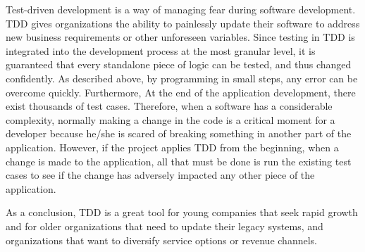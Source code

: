 Test-driven development is a way of managing fear during software development\cite{Beck2003}. TDD gives organizations the ability to painlessly update their software to address new business requirements or other unforeseen variables. Since testing in TDD is integrated into the development process at the most granular level, it is guaranteed that every standalone piece of logic can be tested, and thus changed confidently. As described above, by programming in small steps, any error can be overcome quickly. Furthermore, At the end of the application development, there exist thousands of test cases. Therefore, when a software has a considerable complexity, normally making a change in the code is a critical moment for a developer because he/she is scared of breaking something in another part of the application. However, if the project applies TDD from the beginning, when a change is made to the application, all that must be done is run the existing test cases to see if the change has adversely impacted any other piece of the application.

As a conclusion, TDD is a great tool for young companies that seek rapid growth and for older organizations that need to update their legacy systems, and organizations that want to diversify service options or revenue channels.
